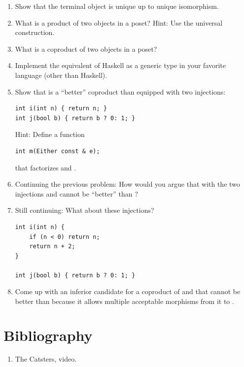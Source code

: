 \begin{enumerate}
\tightlist
\item
  Show that the terminal object is unique up to unique isomorphism.
\item
  What is a product of two objects in a poset? Hint: Use the universal
  construction.
\item
  What is a coproduct of two objects in a poset?
\item
  Implement the equivalent of Haskell  as a generic type
  in your favorite language (other than Haskell).
\item
  Show that  is a ``better'' coproduct than 
  equipped with two injections:

\begin{Verbatim}
int i(int n) { return n; }
int j(bool b) { return b ? 0: 1; }
\end{Verbatim}

  Hint: Define a function

\begin{Verbatim}
int m(Either const & e);
\end{Verbatim}

  that factorizes  and .
\item
  Continuing the previous problem: How would you argue that 
  with the two injections  and  cannot be ``better''
  than ?
\item
  Still continuing: What about these injections?

\begin{Verbatim}
int i(int n) { 
    if (n < 0) return n;
    return n + 2;
}

int j(bool b) { return b ? 0: 1; }
\end{Verbatim}
\item
  Come up with an inferior candidate for a coproduct of  and
   that cannot be better than  because it
  allows multiple acceptable morphisms from it to .
\end{enumerate}

\section{Bibliography}

\begin{enumerate}
\tightlist
\item
  The Catsters,
   video.
\end{enumerate}